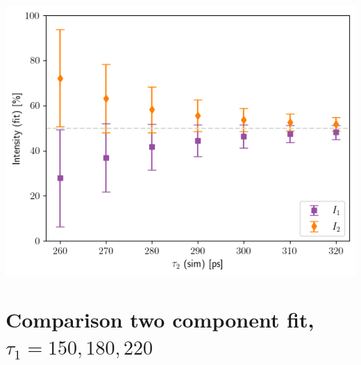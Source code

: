 \begin{minipage}{\linewidth}
     
    \includegraphics[width= .47\linewidth]{Batch 3/regular IRF/tau1 220/output/plotfin/5050.png}
    \label{fig:220-5050}
\end{minipage}

\section{\boldmath Comparison two component fit, $\tau_1 = 150,180,220$ \unboldmath \label{comp-t1}}


